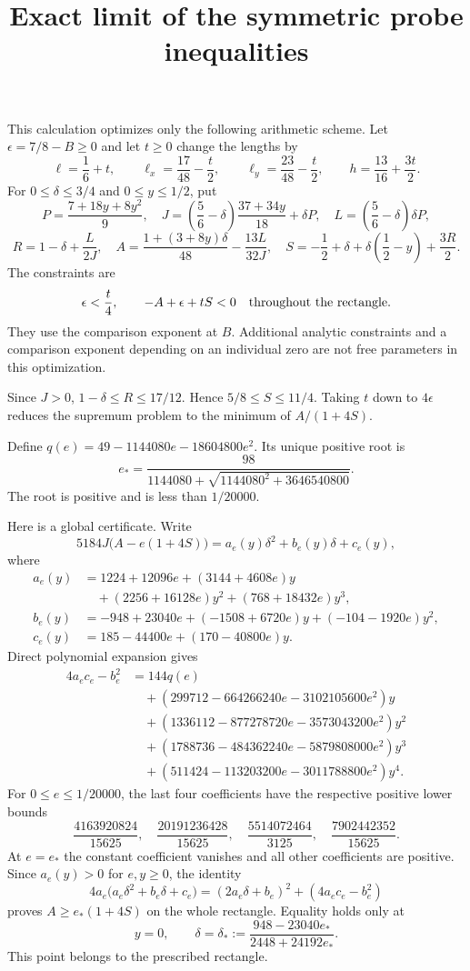 \documentclass[11pt]{article}
\title{Exact limit of the symmetric probe inequalities}
\author{}
\date{}
\begin{document}
\maketitle

This calculation optimizes only the following arithmetic scheme.
Let $\epsilon=7/8-B\geq0$ and let $t\geq0$ change the lengths by
\[
 \ell=\frac16+t,\qquad
 \ell_x=\frac{17}{48}-\frac t2,\qquad
 \ell_y=\frac{23}{48}-\frac t2,\qquad
 h=\frac{13}{16}+\frac{3t}{2}.
\]
For $0\leq\delta\leq3/4$ and $0\leq y\leq1/2$, put
\[
 P=\frac{7+18y+8y^2}{9},\quad
 J=\left(\frac56-\delta\right)\frac{37+34y}{18}+\delta P,
 \quad L=\left(\frac56-\delta\right)\delta P,
\]
\[
 R=1-\delta+\frac{L}{2J},\quad
 A=\frac{1+(3+8y)\delta}{48}-\frac{13L}{32J},\quad
 S=-\frac12+\delta+\delta\left(\frac12-y\right)+\frac{3R}{2}.
\]
The constraints are
\[
 \epsilon<\frac t4,
 \qquad -A+\epsilon+tS<0\quad\hbox{throughout the rectangle}.
\]
They use the comparison exponent at $B$. Additional analytic constraints
and a comparison exponent depending on an individual zero are not free
parameters in this optimization.

Since $J>0$, $1-\delta\leq R\leq17/12$. Hence
$5/8\leq S\leq11/4$. Taking $t$ down to $4\epsilon$ reduces the
supremum problem to the minimum of $A/(1+4S)$.

Define $q(e)=49-1144080e-18604800e^2$. Its unique positive root is
\[
 e_* = \frac{98}{1144080+
   \sqrt{1144080^2+3646540800}}.
\]
The root is positive and is less than $1/20000$.

Here is a global certificate. Write
\[
 5184J\bigl(A-e(1+4S)\bigr)=a_e(y)\delta^2+b_e(y)\delta+c_e(y),
\]
where
\begin{align*}
 a_e(y)&=1224+12096e+(3144+4608e)y\\
 &\quad +(2256+16128e)y^2+(768+18432e)y^3,\\
 b_e(y)&=-948+23040e+(-1508+6720e)y+(-104-1920e)y^2,\\
 c_e(y)&=185-44400e+(170-40800e)y.
\end{align*}
Direct polynomial expansion gives
\begin{align*}
 4a_ec_e-b_e^2
 &=144q(e)\\
 &\quad +(299712-664266240e-3102105600e^2)y\\
 &\quad +(1336112-877278720e-3573043200e^2)y^2\\
 &\quad +(1788736-484362240e-5879808000e^2)y^3\\
 &\quad +(511424-113203200e-3011788800e^2)y^4.
\end{align*}
For $0\leq e\leq1/20000$, the last four coefficients have the
respective positive lower bounds
\[
 \frac{4163920824}{15625},\quad
 \frac{20191236428}{15625},\quad
 \frac{5514072464}{3125},\quad
 \frac{7902442352}{15625}.
\]
At $e=e_*$ the constant coefficient vanishes and all other coefficients
are positive. Since $a_e(y)>0$ for $e,y\geq0$, the identity
\[
 4a_e\bigl(a_e\delta^2+b_e\delta+c_e\bigr)
 =(2a_e\delta+b_e)^2+(4a_ec_e-b_e^2)
\]
proves $A\geq e_*(1+4S)$ on the whole rectangle. Equality holds only at
\[
 y=0,\qquad
 \delta=\delta_*:=\frac{948-23040e_*}{2448+24192e_*}.
\]
This point belongs to the prescribed rectangle.
\end{document}

